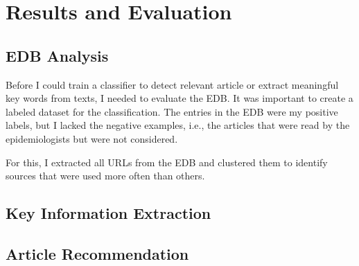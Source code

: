 \chapter{Results and Evaluation}
\section{EDB Analysis}\label{edb analysis}
Before I could train a classifier to detect relevant article or extract meaningful key words from texts, I needed to evaluate the EDB. It was important to create a labeled dataset for the classification. The entries in the EDB were my positive labels, but I lacked the negative examples, i.e., the articles that were read by the epidemiologists but were not considered.

For this, I extracted all URLs from the EDB and clustered them to identify sources that were used more often than others.
\section{Key Information Extraction}
\section{Article Recommendation}
